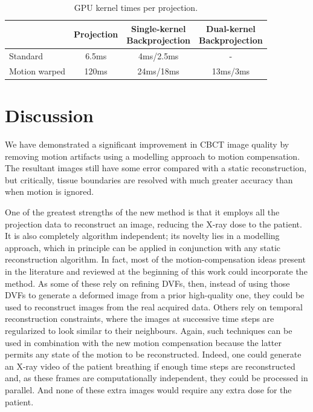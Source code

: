 \begin{table}[H]
\begin{center}
\caption{GPU kernel times per projection.}
\label{tab:times}
\begin{tabular}{|l|| c | c | c |}
\hline
& Projection & \thead{Single-kernel \\Backprojection} & \thead{Dual-kernel\\ Backprojection}\\  
\hline
\hline
Standard& 6.5ms& 4ms/2.5ms&-\\   
Motion warped&120ms &24ms/18ms &13ms/3ms\\
\hline  
\end{tabular}
\end{center}
\end{table}

\section{Discussion}

We have demonstrated a significant improvement in CBCT image quality by removing motion artifacts using a modelling approach to motion compensation.  The resultant images still have some error compared with a static reconstruction, but critically, tissue boundaries are resolved with much greater accuracy than when motion is ignored. 

One of the greatest strengths of the new method is that it employs all the projection data to reconstruct an image, reducing the X-ray dose to the patient.  It is also completely algorithm independent; its novelty lies in a modelling approach, which in principle can be applied in conjunction with any static reconstruction algorithm.  In fact, most of the motion-compensation ideas present in the literature and reviewed at the beginning of this work could incorporate the method.  As some of these rely on refining DVFs, then, instead of using those DVFs to generate a deformed image from a prior high-quality one, they could be used to reconstruct images from the real acquired data.  Others rely on temporal reconstruction constraints, where the images at successive time steps are regularized to look similar to their neighbours.  Again, such techniques can be used in combination with the new motion compensation because the latter permits any state of the motion to be reconstructed.  Indeed, one could generate an X-ray video of the patient breathing if enough time steps are reconstructed and, as these frames are computationally independent, they could be processed in parallel.  And none of these extra images would require any extra dose for the patient.

